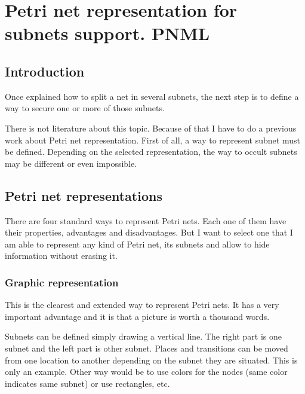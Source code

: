 
\chapter{Petri net representation for subnets support. PNML} %

\label{Chapter: PNML} %


\section{Introduction}

Once explained how to split a net in several subnets, the next step is to define a way to secure one or more of those subnets.

 There is not literature about this
topic. Because of that I have to do a previous work about Petri net representation.
First of all,  a way to represent subnet must be defined. Depending on the selected representation, the way to occult subnets may
be different or even impossible.

\section{Petri net representations}
There are four standard ways to represent Petri nets. Each one of them have their
properties, advantages and disadvantages. But I want to select one that I am able to represent any kind of Petri net, its subnets and allow to hide information without erasing it. 

\subsection{Graphic representation}

This is the clearest and extended way to represent Petri nets. It has a
very important advantage and it is that a picture is worth a thousand words.


Subnets can be defined simply drawing a vertical line. The right part is
one subnet and the left part is other subnet. Places and transitions
can be moved from one location to another depending on the subnet they are
situated. This is only an example. Other way would be to use colors for the
nodes (same color indicates same subnet) or use rectangles, etc.

